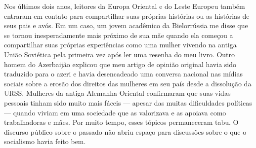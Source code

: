 Nos últimos dois anos, leitores da Europa Oriental e do Leste Europeu também entraram em contato para compartilhar suas próprias histórias ou as histórias de seus pais e avós. Em um caso, um jovem acadêmico da Bielorrússia me disse que se tornou inesperadamente mais próximo de sua mãe quando ela começou a compartilhar suas próprias experiências como uma mulher vivendo na antiga União Soviética pela primeira vez após ler uma resenha do meu livro. Outro homem do Azerbaijão explicou que meu artigo de opinião original havia sido traduzido para o azeri e havia desencadeado uma conversa nacional nas mídias sociais sobre a erosão dos direitos das mulheres em seu país desde a dissolução da URSS. Mulheres da antiga Alemanha Oriental confirmaram que suas vidas pessoais tinham sido muito mais fáceis — apesar das muitas dificuldades políticas — quando viviam em uma sociedade que as valorizava e as apoiava como trabalhadoras e mães. Por muito tempo, esses tópicos permaneceram tabu. O discurso público sobre o passado não abriu espaço para discussões sobre o que o socialismo havia feito bem.
 \par 
